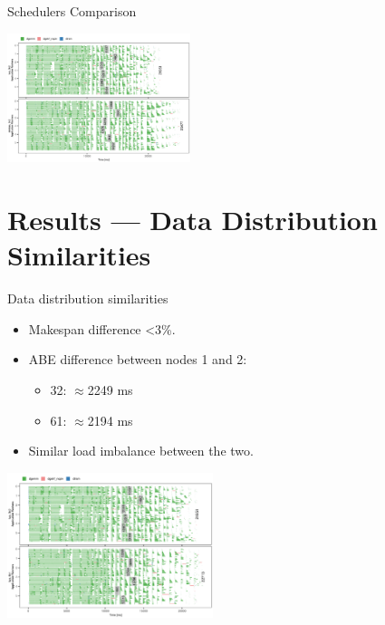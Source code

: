 \documentclass[12pt,xcolor=dvipsnames,presentation,aspectratio=169]{beamer}
\begin{document}
{\begin{frame}[label={sec:orgaa7835d},fragile]{Schedulers Comparison}
\begin{center}
\includegraphics[width=0.4\textwidth]{../img/lws-vs-dmdas-3x2-openmpi-traces.pdf}
\end{center}
\end{frame}
\section{Results — Data Distribution Similarities}
\label{sec:org2bfa49e}
\begin{frame}[label={sec:orgaa06962}]{Data distribution similarities}
\begin{itemize}
\item Makespan difference <3\%.
\item ABE difference between nodes 1 and 2:
\begin{itemize}
\item 3\texttimes{}2: \(\approx\)2249 ms
\item 6\texttimes{}1: \(\approx\)2194 ms
\end{itemize}
\item Similar load imbalance between the two.
\end{itemize}

\begin{center}
\includegraphics[width=0.45\textwidth]{../img/lws-3x2-versus-6x1-openmpi-traces.pdf}
\end{center}
\end{frame}
}
\end{document}
